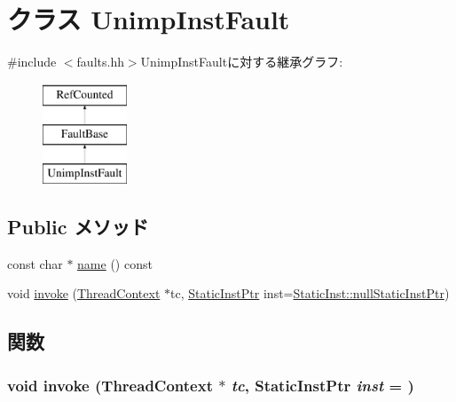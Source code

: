 \hypertarget{classX86ISA_1_1UnimpInstFault}{
\section{クラス UnimpInstFault}
\label{classX86ISA_1_1UnimpInstFault}
}


{\ttfamily \#include $<$faults.hh$>$}UnimpInstFaultに対する継承グラフ:\begin{figure}[H]
\begin{center}
\leavevmode
\includegraphics[height=3cm]{classX86ISA_1_1UnimpInstFault}
\end{center}
\end{figure}
\subsection*{Public メソッド}
\begin{DoxyCompactItemize}
\item 
const char $\ast$ \hyperlink{classX86ISA_1_1UnimpInstFault_a862958aa3c2b9bf36903f1f0f2e81c54}{name} () const 
\item 
void \hyperlink{classX86ISA_1_1UnimpInstFault_a2bd783b42262278d41157d428e1f8d6f}{invoke} (\hyperlink{classThreadContext}{ThreadContext} $\ast$tc, \hyperlink{classRefCountingPtr}{StaticInstPtr} inst=\hyperlink{classStaticInst_aa793d9793af735f09096369fb17567b6}{StaticInst::nullStaticInstPtr})
\end{DoxyCompactItemize}


\subsection{関数}
\hypertarget{classX86ISA_1_1UnimpInstFault_a2bd783b42262278d41157d428e1f8d6f}{
\subsubsection[{invoke}]{\setlength{\rightskip}{0pt plus 5cm}void invoke ({\bf ThreadContext} $\ast$ {\em tc}, \/  {\bf StaticInstPtr} {\em inst} = {})}}
\label{classX86ISA_1_1UnimpInstFault_a2bd783b42262278d41157d428e1f8d6f}


